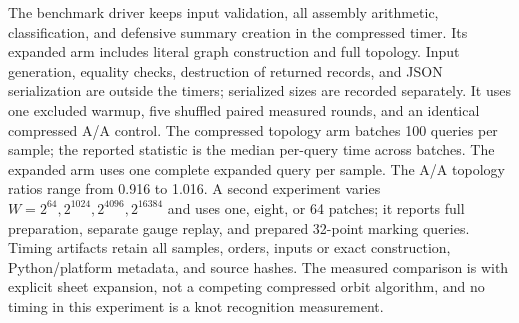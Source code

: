 The benchmark driver keeps input validation, all assembly arithmetic,
classification, and defensive summary creation in the compressed timer.
Its expanded arm includes literal graph construction and full topology.
Input generation, equality checks, destruction of returned records, and
JSON serialization are outside the timers; serialized sizes are recorded
separately.  It uses one excluded warmup, five shuffled paired measured
rounds, and an identical compressed A/A control.  The compressed topology
arm batches 100 queries per sample; the reported statistic is the median
per-query time across batches.  The expanded arm uses one complete expanded
query per sample.  The A/A topology ratios range from 0.916 to 1.016.
A second experiment
varies $W=2^{64},2^{1024},2^{4096},2^{16384}$ and uses one, eight, or 64
patches; it reports full preparation, separate gauge replay, and prepared
32-point marking queries.  Timing artifacts retain all samples, orders,
inputs or exact construction, Python/platform metadata, and source hashes.
The measured comparison is with explicit sheet expansion, not a competing
compressed orbit algorithm, and no timing in this experiment is a knot
recognition measurement.
